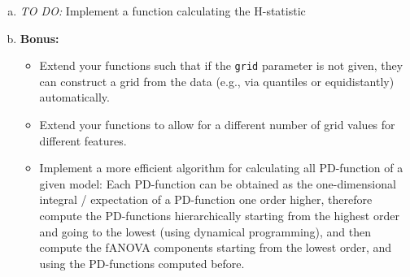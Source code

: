 {\begin{enumerate}[a)]
    \item
    \textit{TO DO:}
    Implement a function calculating the H-statistic

    \item \textbf{Bonus:}
    \begin{itemize}
        \item Extend your functions such that if the \texttt{grid} parameter is not given, they can construct a grid from the data (e.g., via quantiles or equidistantly) automatically.
        \item Extend your functions to allow for a different number of grid values for different features.
        \item Implement a more efficient algorithm for calculating all PD-function of a given model: Each PD-function can be obtained as the one-dimensional integral / expectation of a PD-function one order higher, therefore compute the PD-functions hierarchically starting from the highest order and going to the lowest (using dynamical programming), and then compute the fANOVA components starting from the lowest order, and using the PD-functions computed before.
    \end{itemize}
    
        
\end{enumerate}
    
}